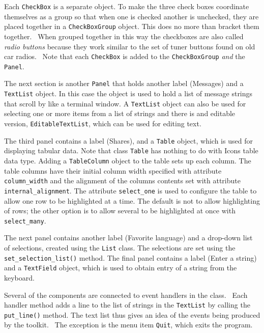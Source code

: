 Each \texttt{CheckBox} is a separate object. To make the three check
boxes coordinate themselves as a group so that when one is checked
another is unchecked, they are placed together in a
\texttt{CheckBoxGroup} object. This does no more than
{\textquotedbl}bracket{\textquotedbl} them together. \ When grouped
together in this way the checkboxes are also called \textit{radio buttons} because they work similar to the set of
tuner buttons found on old car radios. \ Note that each
\texttt{CheckBox} is added to the \texttt{CheckBoxGroup} \textit{and}
the \texttt{Panel}.

The next section is another \texttt{Panel} that holds another label
({\textquotedbl}Messages{\textquotedbl}) and a \texttt{TextList}
object. In this case the object is used to hold a list of message
strings that scroll by like a terminal window. A \texttt{TextList}
object can also be used for selecting one or more items from a list of
strings and there is and editable version, \texttt{EditableTextList},
which can be used for editing text.

The third panel contains a label ({\textquotedbl}Shares{\textquotedbl}),
and a \texttt{Table} object, which is used for displaying tabular data.
Note that class \texttt{Table} has nothing to do with
Icon{\textquotesingle}s table data type. Adding a \texttt{TableColumn}
object to the table sets up each column. The table columns have their
initial column width specified with attribute \texttt{column\_width}
and the alignment of the column{\textquotesingle}s contents set with
attribute \texttt{internal\_alignment}. The attribute
\texttt{select\_one} is used to configure the table to allow one row to
be highlighted at a time. The default is not to allow highlighting of
rows; the other option is to allow several to be highlighted at once
with \texttt{select\_many}.

The next panel contains another label ({\textquotedbl}Favorite
language{\textquotedbl}) and a drop-down list of selections, created
using the \texttt{List} class. The selections are set using the
\texttt{set\_selection\_list()} method. The final panel contains a
label ({\textquotedbl}Enter a string{\textquotedbl}) and a
\texttt{TextField} object, which is used to obtain entry of a string
from the keyboard.

Several of the components are connected to event handlers in the class.
\ Each handler method adds a line to the list of strings in the
\texttt{TextList} by calling the \texttt{put\_line()} method. The text
list thus gives an idea of the events being produced by the toolkit.
\ The exception is the menu item \texttt{Quit}, which exits the
program.

